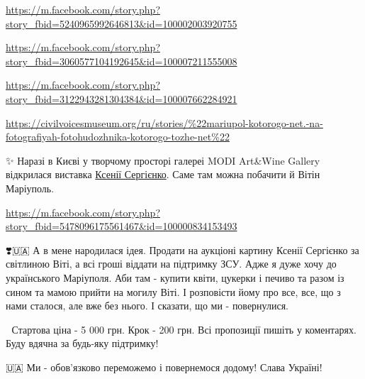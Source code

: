 \url{https://m.facebook.com/story.php?story_fbid=5240965992646813&id=100002003920755}

\url{https://m.facebook.com/story.php?story_fbid=3060577104192645&id=100007211555008}

\url{https://m.facebook.com/story.php?story_fbid=3122943281304384&id=100007662284921}

\url{https://civilvoicesmuseum.org/ru/stories/%22mariupol-kotorogo-net.-na-fotografiyah-fotohudozhnika-kotorogo-tozhe-net%22}

✨ Наразі в Києві у творчому просторі галереі MODI Art\&Wine Gallery відкрилася
виставка \href{https://www.facebook.com/o.serhiienko}{Ксенії Сергієнко}. Саме там можна побачити й Вітін Маріуполь.

\url{https://m.facebook.com/story.php?story_fbid=5478096175561467&id=100000834153493}

❣️🇺🇦 А в мене народилася ідея. Продати на аукціоні картину Ксенії Сергієнко за
світлиною Віті, а всі гроші віддати на підтримку ЗСУ. Адже я дуже хочу до
українського Маріуполя. Аби там - купити квіти, цукерки і печиво та разом із
сином та мамою прийти на могилу Віті. І розповісти йому про все, все, що з нами
сталося, але вже без нього. І сказати, що ми - повернулися. 

📌 Стартова ціна - 5 000 грн. Крок - 200 грн. Всі пропозиції пишіть у
коментарях. Буду вдячна за будь-яку підтримку! 

🇺🇦 Ми - обов'язково переможемо і повернемося додому! Слава Україні!
